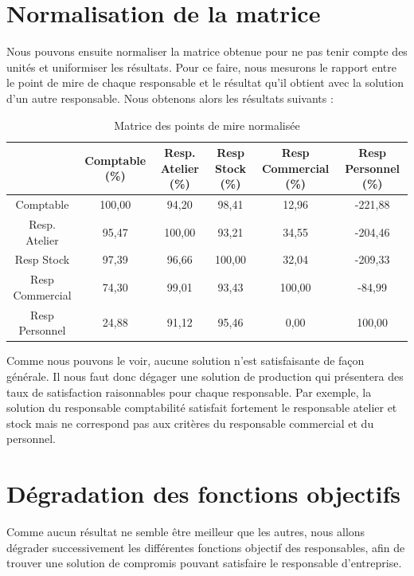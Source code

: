 \documentclass[paper=a4, fontsize=11pt]{report}
\numberwithin{equation}{section}		%
\numberwithin{figure}{section}			%
\numberwithin{table}{section}				%
\begin{document}
\section{Normalisation de la matrice}

Nous pouvons ensuite normaliser la matrice obtenue pour ne pas tenir compte des unités et uniformiser les résultats. Pour ce faire, nous mesurons le rapport entre le point de mire de chaque responsable et le résultat qu'il obtient avec la solution d'un autre responsable. Nous obtenons alors les résultats suivants : 

\begin{table}[H]
\begin{center}
\begin{tabular}{c|ccccc}
 & Comptable \scriptsize{(\%)} & Resp. Atelier \scriptsize{(\%)} & Resp Stock \scriptsize{(\%)} & Resp Commercial \scriptsize{(\%)} &  Resp Personnel \scriptsize{(\%)}\\ 
\hline 
Comptable &  \cellcolor{black!5} 100,00 & 94,20 & 98,41 & 12,96 & -221,88 \\ 
Resp. Atelier & 95,47 & \cellcolor{black!5}100,00 & 93,21 & 34,55 & -204,46 \\ 
Resp Stock & 97,39 & 96,66 & \cellcolor{black!5}100,00 & 32,04 & -209,33 \\ 
Resp Commercial & 74,30 & 99,01 & 93,43 & \cellcolor{black!5}100,00 & -84,99 \\ 
Resp Personnel & 24,88 & 91,12 & 95,46 & 0,00 & \cellcolor{black!5}100,00 \\ 
\end{tabular}
\caption{Matrice des points de mire normalisée} 
\end{center}
\end{table}

Comme nous pouvons le voir, aucune solution n'est satisfaisante de façon générale. Il nous faut donc dégager une solution de production qui présentera des taux de satisfaction raisonnables pour chaque responsable. Par exemple, la solution du responsable comptabilité satisfait fortement le responsable atelier et stock mais ne correspond pas aux critères du responsable commercial et du personnel.

\section{Dégradation des fonctions objectifs}

Comme aucun résultat ne semble être meilleur que les autres, nous allons dégrader successivement les différentes fonctions objectif des responsables, afin de trouver une solution de compromis pouvant satisfaire le responsable d'entreprise.\\
\end{document}
